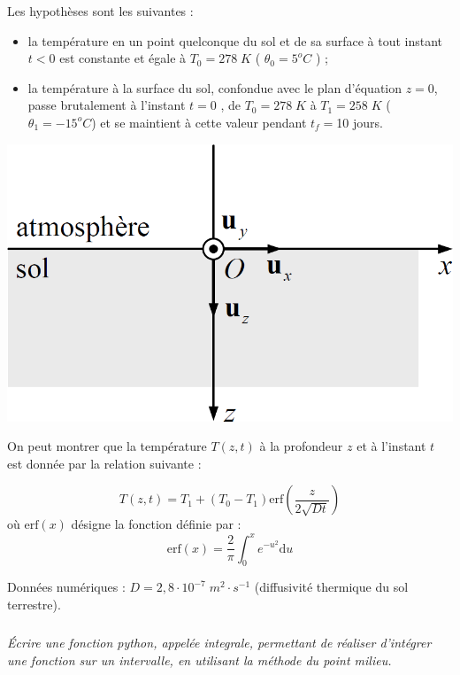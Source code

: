 \documentclass[10pt,oneside]{article}
\begin{document}
\begin{minipage}[c]{.6\linewidth}
Les hypothèses sont les suivantes :
\begin{itemize}
\item la température en un point quelconque du sol et de sa surface à tout instant $t < 0$ est constante et égale à $T_0=278\;K$ ( $\theta_0=5^oC$ ) ;
\item la température à la surface du sol, confondue avec le plan d’équation $z = 0$, passe brutalement à l’instant $t = 0$ , de $T_0 = 278\;K$ à $T_1 =  258\; K$ ($\theta_1 = -15^o C$) et se maintient à cette valeur pendant
$t_f= $10 jours.
\end{itemize}
\end{minipage}\hfill
\begin{minipage}[c]{.35\linewidth}
\begin{center}
\includegraphics[width=.95\textwidth]{images/canalisation}
\end{center}
\end{minipage}

On peut montrer que la température $T(z, t)$ à la profondeur $z$ et à l’instant $t$ est donnée par la relation suivante :

$$
T(z,t)=T_1 + (T_0-T_1) \text{erf}\left( \dfrac{z}{2\sqrt{Dt}} \right)
$$
où $\text{erf}(x)$ désigne la fonction définie par :
$$
\text{erf}(x) = \dfrac{2}{\pi}\int^x_0 e^{-u^2} \mathrm{d}u
$$

Données numériques : $D=2,8\cdot 10^{-7} \; m^2\cdot s^{-1}$ (diffusivité thermique du sol terrestre).

\setcounter{subparagraph}{0}

\subparagraph{}
\textit{Écrire une fonction python, appelée \textsf{integrale}, permettant de réaliser d'intégrer une fonction sur un intervalle, en utilisant la méthode du point milieu.}
\end{document}
